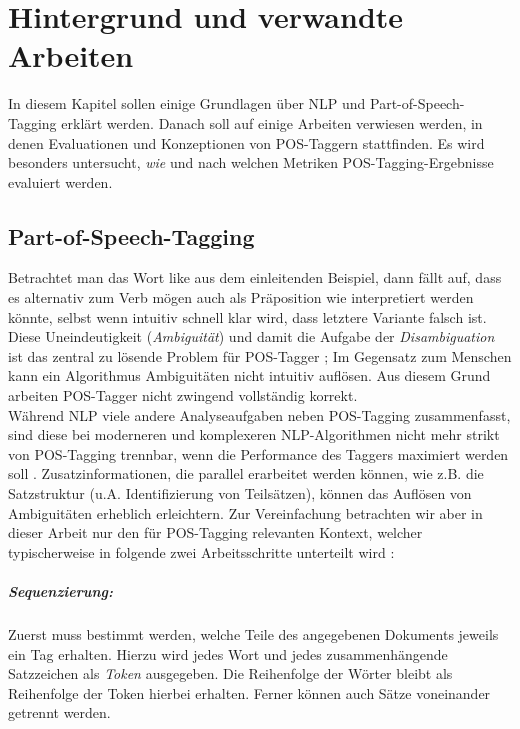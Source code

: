 %
\chapter{Hintergrund und verwandte Arbeiten}
\label{sec:related}

In diesem Kapitel sollen einige Grundlagen über NLP und Part-of-Speech-Tagging erklärt werden. Danach soll auf einige Arbeiten verwiesen werden, in denen Evaluationen und Konzeptionen von POS-Taggern stattfinden. Es wird besonders untersucht, \textit{wie} und nach welchen Metriken POS-Tagging-Ergebnisse evaluiert werden.

\section{Part-of-Speech-Tagging}
\label{sec:related:pos}

Betrachtet man das Wort \glqq like\grqq{} aus dem einleitenden Beispiel, dann fällt auf, dass es alternativ zum Verb \glqq mögen\grqq{} auch als Präposition \glqq wie\grqq{} interpretiert werden könnte, selbst wenn intuitiv schnell klar wird, dass letztere Variante falsch ist. Diese Uneindeutigkeit (\textit{Ambiguität}) und damit die Aufgabe der \textit{Disambiguation} ist das zentral zu lösende Problem für POS-Tagger  \cite{Smith} \cite{Jones}; Im Gegensatz zum Menschen kann ein Algorithmus Ambiguitäten nicht intuitiv auflösen. Aus diesem Grund arbeiten POS-Tagger nicht zwingend vollständig korrekt.
\\
Während NLP viele andere Analyseaufgaben neben POS-Tagging zusammenfasst, sind diese bei moderneren und komplexeren NLP-Algorithmen nicht mehr strikt von POS-Tagging trennbar, wenn die Performance des Taggers maximiert werden soll \cite{Smith}. Zusatzinformationen, die parallel erarbeitet werden können, wie z.B. die Satzstruktur (u.A. Identifizierung von Teilsätzen), können das Auflösen von Ambiguitäten erheblich erleichtern. Zur Vereinfachung betrachten wir aber in dieser Arbeit nur den für POS-Tagging relevanten Kontext, welcher typischerweise in folgende zwei Arbeitsschritte unterteilt wird \cite{Smith}:

\paragraph{Sequenzierung:} Zuerst muss bestimmt werden, welche Teile des angegebenen Dokuments jeweils ein Tag erhalten. Hierzu wird jedes Wort und jedes zusammenhängende Satzzeichen als \textit{Token} ausgegeben. Die Reihenfolge der Wörter bleibt als Reihenfolge der Token hierbei erhalten. Ferner können auch Sätze voneinander getrennt werden.
